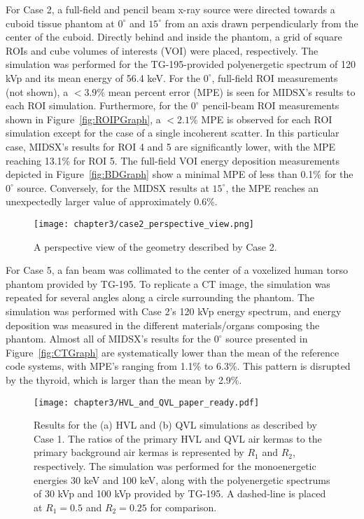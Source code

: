 \par For Case 2, a full-field and pencil beam x-ray source were directed towards a cuboid tissue phantom at $0^\circ$ and $15^\circ$ from an axis drawn perpendicularly from the center of the cuboid. Directly behind and inside the phantom, a grid of square ROIs and cube volumes of interests (VOI) were placed, respectively. The simulation was performed for the TG-195-provided polyenergetic spectrum of 120 kVp and its mean energy of 56.4 keV. For the $0^\circ$, full-field ROI measurements (not shown), a $<3.9$\% mean percent error (MPE) is seen for MIDSX's results to each ROI simulation. Furthermore, for the $0^\circ$ pencil-beam ROI measurements shown in Figure~\ref{fig:ROIPGraph}, a $<2.1$\% MPE is observed for each ROI simulation except for the case of a single incoherent scatter. In this particular case, MIDSX's results for ROI 4 and 5 are significantly lower, with the MPE reaching 13.1\% for ROI 5. The full-field VOI energy deposition measurements depicted in Figure~\ref{fig:BDGraph} show a minimal MPE of less than 0.1\% for the $0^\circ$ source. Conversely, for the MIDSX results at $15^\circ$, the MPE reaches an unexpectedly larger value of approximately 0.6\%.

\begin{figure}
    \centering
    \texttt{[image: chapter3/case2\_perspective\_view.png]}
    \caption{A perspective view of the geometry described by Case 2.}
\end{figure}

\par For Case 5, a fan beam was collimated to the center of a voxelized human torso phantom provided by TG-195. To replicate a CT image, the simulation was repeated for several angles along a circle surrounding the phantom. The simulation was performed with Case 2's 120 kVp energy spectrum, and energy deposition was measured in the different materials/organs composing the phantom. Almost all of MIDSX's results for the $0^\circ$ source presented in Figure~\ref{fig:CTGraph} are systematically lower than the mean of the reference code systems, with MPE's ranging from 1.1\% to 6.3\%. This pattern is disrupted by the thyroid, which is larger than the mean by 2.9\%. 


\begin{figure}[H]
    \centering
	\texttt{[image: chapter3/HVL\_and\_QVL\_paper\_ready.pdf]}
	\caption{Results for the (a) HVL and (b) QVL simulations as described by Case 1. The ratios of the primary HVL and QVL air kermas to the primary background air kermas is represented by $R_1$ and $R_2$, respectively. The simulation was performed for the monoenergetic energies 30 keV and 100 keV, along with the polyenergetic spectrums of 30 kVp and 100 kVp provided by TG-195. A dashed-line is placed at $R_1 = 0.5$ and $R_2 = 0.25$ for comparison.}
	\label{fig:HVLGraph}
\end{figure}

